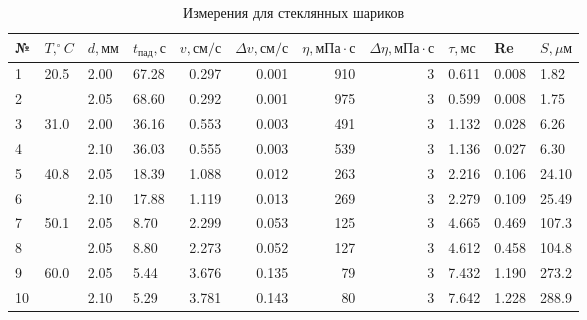\documentclass[a4paper,12pt]{article}
\begin{document}
\begin{enumerate}
	\begin{table}
		\caption{Измерения для стеклянных шариков}
		\begin{center}
			\begin{tabular}{|l|l|l|l|rr|rr|lll|}
				\hline
				{№} & {$T, ^\circ C$} & {$d, мм$} & {$t_{пад}, с$} & {$v, см/с$} & {$\Delta v, см/с$} & {$\eta, мПа \cdot с$} & {$\Delta\eta, мПа \cdot с$} &  {$\tau, мс$} & {Re} & {$S, \mu м$} \\
				\hline
				1 & 20.5 & 2.00 & 67.28 & 0.297 & 0.001 & 910 & 3 & 0.611 & 0.008 & 1.82 \\
				2 &      & 2.05 & 68.60 & 0.292 & 0.001 & 975 & 3 & 0.599 & 0.008 & 1.75 \\ \hline
				3 & 31.0 & 2.00 & 36.16 & 0.553 & 0.003 & 491 & 3 & 1.132 & 0.028 & 6.26 \\
				4 &      & 2.10 & 36.03 & 0.555 & 0.003 & 539 & 3 & 1.136 & 0.027 & 6.30 \\ \hline
				5 & 40.8 & 2.05 & 18.39 & 1.088 & 0.012 & 263 & 3 & 2.216 & 0.106 & 24.10 \\
				6 &      & 2.10 & 17.88 & 1.119 & 0.013 & 269 & 3 & 2.279 & 0.109 & 25.49 \\ \hline
				7 & 50.1 & 2.05 &  8.70 & 2.299 & 0.053 & 125 & 3 & 4.665 & 0.469 & 107.3 \\
				8 &      & 2.05 &  8.80 & 2.273 & 0.052 & 127 & 3 & 4.612 & 0.458 & 104.8 \\ \hline
				9 & 60.0 & 2.05 &  5.44 & 3.676 & 0.135 &  79 & 3 & 7.432 & 1.190 & 273.2 \\
				10 &     & 2.10 &  5.29 & 3.781 & 0.143 &  80 & 3 & 7.642 & 1.228 & 288.9 \\ \hline
			\end{tabular}
			\end{center}
	\end{table}


\end{enumerate}
\end{document}
